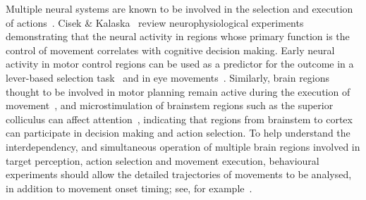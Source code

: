 \documentclass[10pt,letterpaper]{article}
\begin{document}
Multiple neural systems are known to be involved in the selection and
execution of
actions~\cite{cisek_cortical_2007,ueda_encoding_2003,hoshi_distinctions_2007}. Cisek
\& Kalaska~\cite{cisek_neural_2010} review neurophysiological
experiments demonstrating that the neural activity in regions whose
primary function is the control of movement correlates with cognitive
decision making. Early neural activity in motor control regions can be
used as a predictor for the outcome in a lever-based selection
task~\cite{wallis_rule_2003} and in eye
movements~\cite{basso_modulation_1998}. Similarly, brain regions
thought to be involved in motor planning remain active during the
execution of
movement~\cite{cisek_neural_2010,hoshi_distinctions_2007}, and
microstimulation of brainstem regions such as the superior colliculus
can affect attention~\cite{muller_microstimulation_2005}, indicating
that regions from brainstem to cortex can participate in decision
making and action selection.  To help understand the interdependency,
and simultaneous operation of multiple brain regions involved in
target perception, action selection and movement execution,
behavioural experiments should allow the detailed trajectories of
movements to be analysed, in addition to movement onset timing; see,
for example~\cite{jax_hand_2007}.

%
%
%
\end{document}
